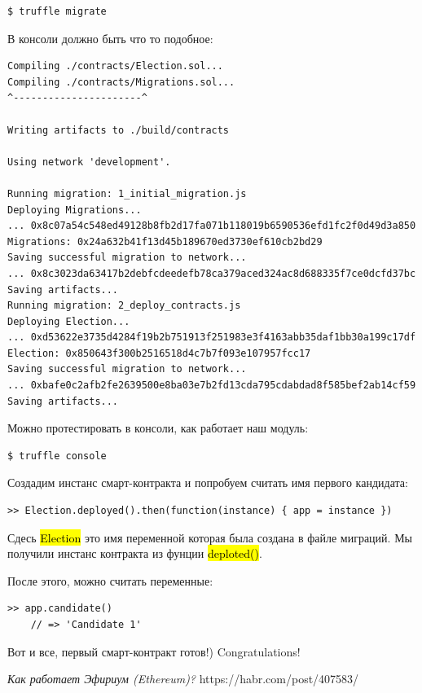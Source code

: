 \documentclass{article}
\begin{document}
\begin{lstlisting}
$ truffle migrate
\end{lstlisting}

В консоли должно быть что то подобное:

\begin{lstlisting}
Compiling ./contracts/Election.sol...
Compiling ./contracts/Migrations.sol...
^----------------------^

Writing artifacts to ./build/contracts

Using network 'development'.

Running migration: 1_initial_migration.js
Deploying Migrations...
... 0x8c07a54c548ed49128b8fb2d17fa071b118019b6590536efd1fc2f0d49d3a850
Migrations: 0x24a632b41f13d45b189670ed3730ef610cb2bd29
Saving successful migration to network...
... 0x8c3023da63417b2debfcdeedefb78ca379aced324ac8d688335f7ce0dcfd37bc
Saving artifacts...
Running migration: 2_deploy_contracts.js
Deploying Election...
... 0xd53622e3735d4284f19b2b751913f251983e3f4163abb35daf1bb30a199c17df
Election: 0x850643f300b2516518d4c7b7f093e107957fcc17
Saving successful migration to network...
... 0xbafe0c2afb2fe2639500e8ba03e7b2fd13cda795cdabdad8f585bef2ab14cf59
Saving artifacts...
\end{lstlisting}

Можно протестировать в консоли, как работает наш модуль:


\begin{lstlisting}
$ truffle console
\end{lstlisting}

Создадим инстанс смарт-контракта и попробуем считать имя первого кандидата:

\begin{lstlisting}
>> Election.deployed().then(function(instance) { app = instance })
\end{lstlisting}

Сдесь \hl{Election} это имя переменной которая была создана в файле миграций.
Мы получили инстанс контракта из фунции \hl{deploted()}.

После этого, можно считать переменные:

\begin{lstlisting}
>> app.candidate()
	// => 'Candidate 1'
\end{lstlisting}


Вот и все, первый смарт-контракт готов!) Congratulations!



\begin{thebibliography}{9}

	  \emph{Как работает Эфириум (Ethereum)?}
	  https://habr.com/post/407583/

\end{thebibliography}
\end{document}
